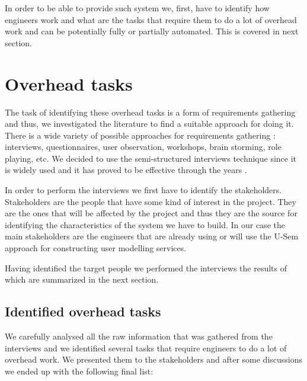 In order to be able to provide such system we, first, have to identify how engineers work and what are the tasks that require them to do a lot of overhead work and can be potentially fully or partially automated. This is covered in next section.

\section{Overhead tasks}

The task of identifying these overhead tasks is a form of requirements gathering \cite{hickey2004unified} and thus, we investigated the literature to find a suitable approach for doing it. There is a wide variety of possible approaches for requirements gathering \cite{hickey2004unified} : interviews, questionnaires, user observation, workshops, brain storming, role playing, etc. We decided to use the semi-structured interviews technique since it is widely used and it has proved to be effective through the years \cite{dieste2008understanding}.

In order to perform the interviews we first have to identify the stakeholders. Stakeholders are the people that have some kind of interest in the project. They are the ones that will be affected by the project and thus they are the source for identifying the characteristics of the system we have to build. In our case the main stakeholders are the engineers that are already using or will use the U-Sem approach for constructing user modelling services. 

Having identified the target people we performed the interviews the results of which are summarized in the next section. 

\subsection{Identified overhead tasks}
\label{sec:features}

We carefully analysed all the raw information that was gathered from the interviews and we identified several tasks that require engineers to do a lot of overhead work. We presented them to the stakeholders and after some discussions we ended up with the following final list: 

